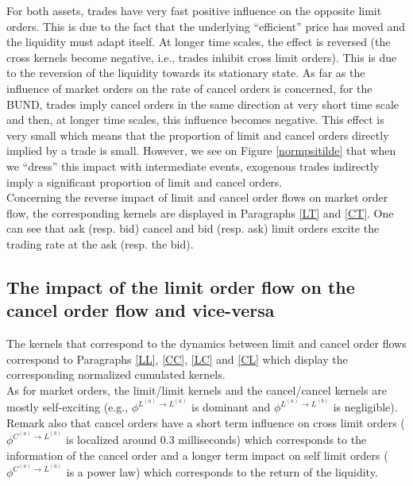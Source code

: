 \documentclass[a4paper,11pt]{article}
\newcommand{\CA}{C^{(a)}}
\newcommand{\LA}{L^{(a)}}
\newcommand{\LB}{L^{(b)}}
\begin{document}
\noindent For both assets, trades have very fast positive influence on the opposite limit orders. This is due to the fact that the underlying ``efficient'' price has moved and the liquidity must adapt itself. At longer time scales, the effect is reversed (the cross kernels become negative, i.e., trades inhibit cross limit orders). This is due to the reversion of the liquidity towards its stationary state. As far as the influence of market orders on the rate of cancel orders is concerned, for the BUND, trades imply cancel orders in the same direction at very short time scale and then, at longer time scales, this influence becomes negative. This effect is very small which means that the proportion of limit and cancel orders directly implied by a trade is small. However, we see on Figure \ref{normpsitilde} that when we ``dress'' this impact with intermediate events, exogenous trades indirectly imply a significant proportion of limit and cancel orders.\\

\noindent Concerning the reverse impact of limit and cancel order flows on market order flow, the corresponding kernels are displayed in Paragraphs \ref{LT} and \ref{CT}. One can see that ask (resp. bid) cancel and bid (resp. ask) limit orders excite the trading rate at the ask (resp. the bid).



\subsection{The impact of the limit order flow on the cancel order flow and vice-versa}
The kernels that correspond to the dynamics between limit and cancel order flows correspond to Paragraphs \ref{LL}, \ref{CC}, \ref{LC} and \ref{CL} which display the corresponding normalized cumulated kernels.\\

\noindent As for market orders, the limit/limit kernels and the cancel/cancel kernels are mostly self-exciting (e.g., $\phi^{\LA\rightarrow \LA}$ is dominant and $\phi^{\LA\rightarrow \LB}$ is negligible). Remark also that cancel orders have a short term influence on cross limit orders ($\phi^{\CA\rightarrow \LB}$ is localized around 0.3 milliseconds) which corresponds to the information of the cancel order and a longer term impact on self limit orders ($\phi^{\CA\rightarrow \LA}$ is a power law) which corresponds to the return of the liquidity. \\
\end{document}
